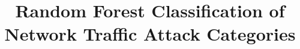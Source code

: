 \documentclass[conference,a4paper,10pt]{IEEEtran}
\begin{document}
\title{Random Forest Classification of\\Network Traffic Attack Categories}

\author{
}

\maketitle
{}










\appendices

\end{document}
